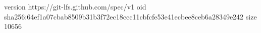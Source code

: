 version https://git-lfs.github.com/spec/v1
oid sha256:64ef1a07cbab8509b31b3f72ec18ccc11cbfcfe53e41ecbee8ceb6a28349e242
size 10656
